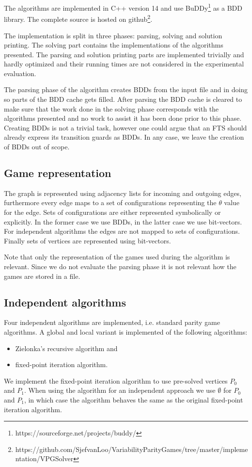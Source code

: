 The algorithms are implemented in C++ version 14 and use BuDDy\footnote{\label{note1}https://sourceforge.net/projects/buddy/} as a BDD library. The complete source is hosted on github\footnote{\label{note2}https://github.com/SjefvanLoo/VariabilityParityGames/tree/master/implementation/VPGSolver}.

The implementation is split in three phases: parsing, solving and solution printing. The solving part contains the implementations of the algorithms presented. The parsing and solution printing parts are implemented trivially and hardly optimized and their running times are not considered in the experimental evaluation.

The parsing phase of the algorithm creates BDDs from the input file and in doing so parts of the BDD cache gets filled. After parsing the BDD cache is cleared to make sure that the work done in the solving phase corresponds with the algorithms presented and no work to assist it has been done prior to this phase. Creating BDDs is not a trivial task, however one could argue that an FTS should already express its transition guards as BDDs. In any case, we leave the creation of BDDs out of scope.

\subsection{Game representation}
The graph is represented using adjacency lists for incoming and outgoing edges, furthermore every edge maps to a set of configurations representing the $\theta$ value for the edge. Sets of configurations are either represented symbolically or explicitly. In the former case we use BDDs, in the latter case we use bit-vectors. For independent algorithms the edges are not mapped to sets of configurations. Finally sets of vertices are represented using bit-vectors.

Note that only the representation of the games used during the algorithm is relevant. Since we do not evaluate the parsing phase it is not relevant how the games are stored in a file.
\subsection{Independent algorithms}
Four independent algorithms are implemented, i.e. standard parity game algorithms. A global and local variant is implemented of the following algorithms:
\begin{itemize}
	\item Zielonka's recursive algorithm and
	\item fixed-point iteration algorithm.
\end{itemize}
We implement the fixed-point iteration algorithm to use pre-solved vertices $P_0$ and $P_1$. When using the algorithm for an independent approach we use $\emptyset$ for $P_0$ and $P_1$, in which case the algorithm behaves the same as the original fixed-point iteration algorithm.

